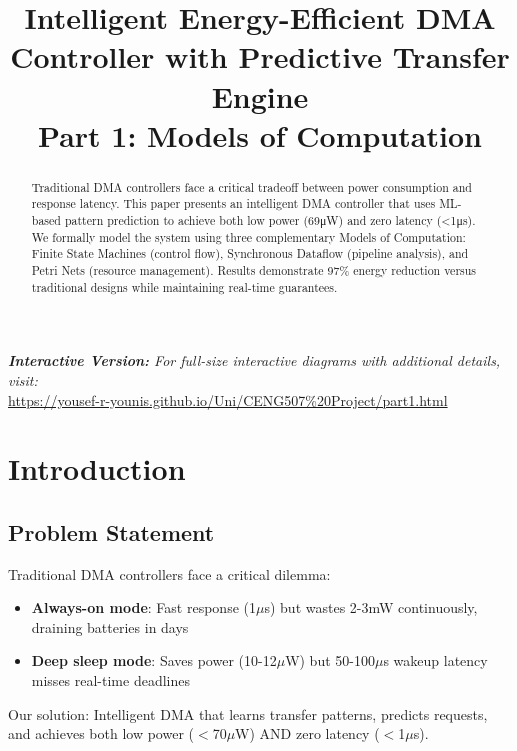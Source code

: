 \documentclass[conference]{IEEEtran}
\begin{document}
\title{Intelligent Energy-Efficient DMA Controller with Predictive Transfer Engine\\\large Part 1: Models of Computation}

\author{
}

\maketitle

\begin{abstract}
Traditional DMA controllers face a critical tradeoff between power consumption and response latency. This paper presents an intelligent DMA controller that uses ML-based pattern prediction to achieve both low power (69μW) and zero latency (<1μs). We formally model the system using three complementary Models of Computation: Finite State Machines (control flow), Synchronous Dataflow (pipeline analysis), and Petri Nets (resource management). Results demonstrate 97\% energy reduction versus traditional designs while maintaining real-time guarantees.
\end{abstract}

\noindent\textit{\textbf{Interactive Version:} For full-size interactive diagrams with additional details, visit:}\\
\url{https://yousef-r-younis.github.io/Uni/CENG507%20Project/part1.html}

\section{Introduction}

\subsection{Problem Statement}
Traditional DMA controllers face a critical dilemma:
\begin{itemize}
    \item \textbf{Always-on mode}: Fast response (1$\mu$s) but wastes 2-3mW continuously, draining batteries in days
    \item \textbf{Deep sleep mode}: Saves power (10-12$\mu$W) but 50-100$\mu$s wakeup latency misses real-time deadlines
\end{itemize}

Our solution: Intelligent DMA that learns transfer patterns, predicts requests, and achieves both low power ($<$70$\mu$W) AND zero latency ($<$1$\mu$s).
\end{document}
